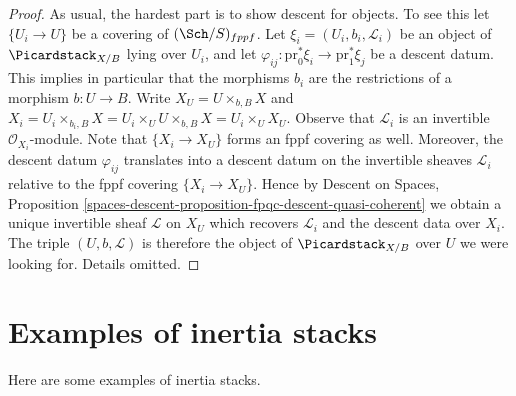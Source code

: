 \begin{proof}
As usual, the hardest part is to show descent for objects.
To see this let $\{U_i \to U\}$ be a covering of $(\Sch/S)_{fppf}$.
Let $\xi_i = (U_i, b_i, \mathcal{L}_i)$ be an object of
$\Picardstack_{X/B}$ lying over $U_i$, and let
$\varphi_{ij} : \text{pr}_0^*\xi_i \to \text{pr}_1^*\xi_j$
be a descent datum. This implies in particular that the morphisms
$b_i$ are the restrictions of a morphism $b : U \to B$.
Write $X_U = U \times_{b, B} X$ and
$X_i = U_i \times_{b_i, B} X =
U_i \times_U U \times_{b, B} X = U_i \times_U X_U$.
Observe that $\mathcal{L}_i$ is an invertible $\mathcal{O}_{X_i}$-module.
Note that $\{X_i \to X_U\}$ forms an fppf covering as well.
Moreover, the descent datum $\varphi_{ij}$ translates into a
descent datum on the invertible sheaves $\mathcal{L}_i$ relative
to the fppf covering $\{X_i \to X_U\}$.
Hence by
Descent on Spaces,
Proposition \ref{spaces-descent-proposition-fpqc-descent-quasi-coherent}
we obtain a unique invertible sheaf $\mathcal{L}$ on $X_U$
which recovers $\mathcal{L}_i$ and the descent data over $X_i$.
The triple $(U, b, \mathcal{L})$ is therefore the object of
$\Picardstack_{X/B}$ over $U$ we were looking for.
Details omitted.
\end{proof}





\section{Examples of inertia stacks}
\label{section-examples-inertia}

\noindent
Here are some examples of inertia stacks.

